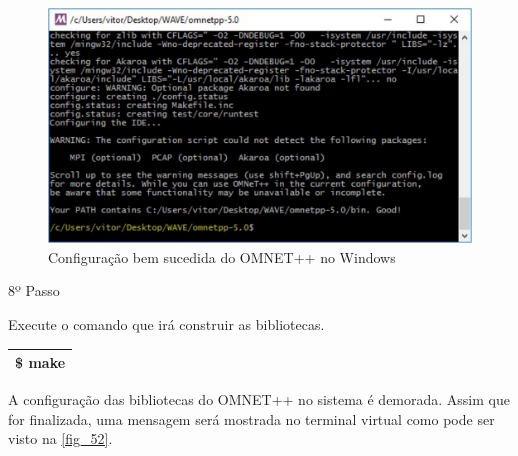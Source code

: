 \documentclass[
12pt,				%
openright,			%
oneside,			%
a4paper,			%
brazil,				%
]{abntex2}
\begin{document}
{\begin{anexosenv}
	                \begin{figure} [H]
		                \centering
		                \includegraphics[scale=.37]{figuras/aneB/51InstalacaoComSucessoLinux}
		                \caption{\label{fig_51}Configuração bem sucedida do OMNET++ no Windows}
	                \end{figure}
                    

                	\begin{description}
		                \item[8º Passo]
		            \end{description}
		            \par Execute o comando que irá construir as bibliotecas.
		
		            \begin{table}[H]
			            \renewcommand{\arraystretch}{1.5}
		                \begin{tabular}{|p{15.5cm}|}
			                \hline
                            \$ make \\
			                \hline
			            \end{tabular}
		            \end{table}
		            
		            \par A configuração das bibliotecas do OMNET++ no sistema é demorada. Assim que for finalizada, uma mensagem será mostrada no terminal virtual como pode ser visto na \autoref{fig_52}.
		            

\end{anexosenv}}
\end{document}

